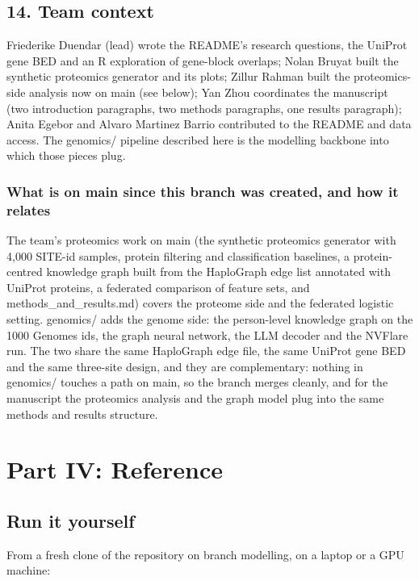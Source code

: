 \documentclass[11pt,a4paper]{article}
\begin{document}
\subsection{14. Team context}

Friederike Duendar (lead) wrote the README's research questions, the UniProt gene BED and an R exploration of gene-block overlaps; Nolan Bruyat built the synthetic proteomics generator and its plots; Zillur Rahman built the proteomics-side analysis now on main (see below); Yan Zhou coordinates the manuscript (two introduction paragraphs, two methods paragraphs, one results paragraph); Anita Egebor and Alvaro Martinez Barrio contributed to the README and data access. The genomics/ pipeline described here is the modelling backbone into which those pieces plug.

\subsubsection{What is on main since this branch was created, and how it relates}

The team's proteomics work on main (the synthetic proteomics generator with 4,000 SITE-id samples, protein filtering and classification baselines, a protein-centred knowledge graph built from the HaploGraph edge list annotated with UniProt proteins, a federated comparison of feature sets, and methods\_and\_results.md) covers the proteome side and the federated logistic setting. genomics/ adds the genome side: the person-level knowledge graph on the 1000 Genomes ids, the graph neural network, the LLM decoder and the NVFlare run. The two share the same HaploGraph edge file, the same UniProt gene BED and the same three-site design, and they are complementary: nothing in genomics/ touches a path on main, so the branch merges cleanly, and for the manuscript the proteomics analysis and the graph model plug into the same methods and results structure.

\section{Part IV: Reference}

\subsection{Run it yourself}

From a fresh clone of the repository on branch modelling, on a laptop or a GPU machine:
\end{document}
